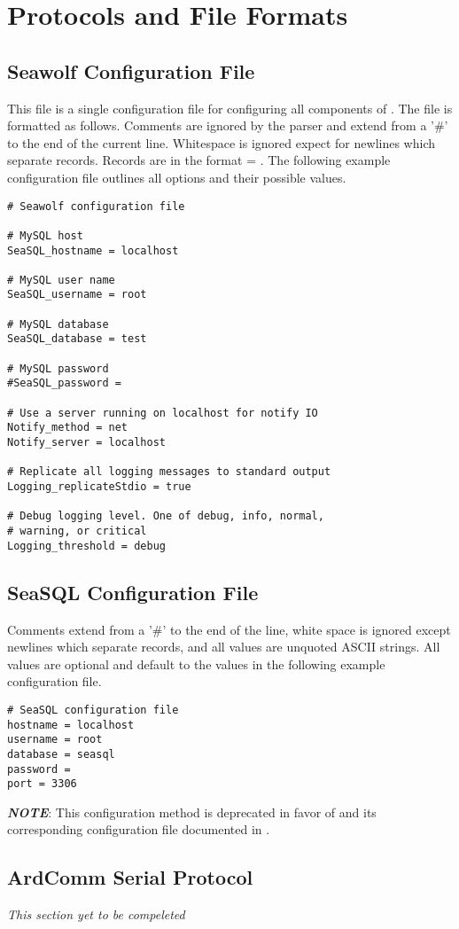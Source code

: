 
\newpage
\section{Protocols and File Formats} \label{formats}
\subsection{Seawolf Configuration File} \label{formatsseawolfconf}
This file is a single configuration file for configuring all components of
\libseawolf{}. The file is formatted as follows. Comments are ignored by the
parser and extend from a '\#' to the end of the current line. Whitespace is
ignored expect for newlines which separate records. Records are in the format
 = . The following example configuration file
outlines all options and their possible values.
\begin{lstlisting}[caption=Example Seawolf configuration file]
# Seawolf configuration file

# MySQL host
SeaSQL_hostname = localhost

# MySQL user name
SeaSQL_username = root

# MySQL database
SeaSQL_database = test

# MySQL password
#SeaSQL_password = 

# Use a server running on localhost for notify IO
Notify_method = net
Notify_server = localhost

# Replicate all logging messages to standard output
Logging_replicateStdio = true

# Debug logging level. One of debug, info, normal,
# warning, or critical
Logging_threshold = debug
\end{lstlisting}

\subsection{SeaSQL Configuration File} \label{formatsseasqlconf}
Comments extend from a '\#' to the end of the line, white space is ignored
except newlines which separate records, and all values are unquoted ASCII
strings. All values are optional and default to the values in the following
example configuration file.
\begin{lstlisting}[caption=Example SeaSQL configuration file]
# SeaSQL configuration file
hostname = localhost
username = root
database = seasql
password = 
port = 3306
\end{lstlisting}
\textbf{\textit{NOTE}}: This configuration method is deprecated in favor of  and its corresponding configuration file documented in . 

\subsection{ArdComm Serial Protocol} \label{formatsardcomm}
\textit{This section yet to be compeleted}

